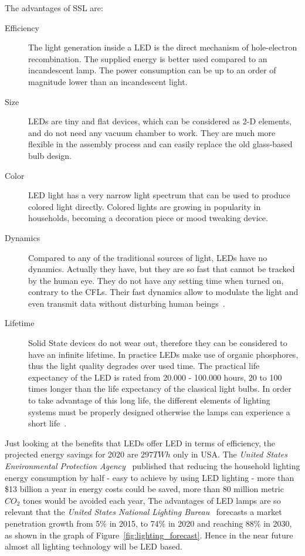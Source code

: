 The advantages of SSL are:
\begin{description}
  \item [Efficiency] The light generation inside a LED is the direct mechanism of hole-electron recombination. The supplied energy is better used compared to an incandescent lamp. The power consumption can be up to an order of magnitude lower than an incandescent light.

  \item [Size] LEDs are tiny and flat devices, which can be considered as 2-D elements,  and do not need any vacuum chamber to work. They are much more flexible in the assembly process and can easily replace the old glass-based bulb design.

  \item [Color] LED light has a very narrow light spectrum that can be used to produce colored light directly. Colored lights are growing in popularity in households, becoming a decoration piece or mood tweaking device.

  \item [Dynamics] Compared to any of the traditional sources of light, LEDs have no dynamics. Actually they have, but they are so fast that cannot be tracked by the human eye. They do not have any setting time when turned on, contrary to the CFLs. Their fast dynamics allow to modulate the light and even transmit data without disturbing human beings~\cite{2000Tanaka,2004Komine}.

  \item [Lifetime] Solid State devices do not wear out, therefore they can be considered to have an infinite lifetime. In practice LEDs make use of organic phosphores, thus the light quality degrades over used time. The practical life expectancy of the LED is rated from 20.000 - 100.000 hours, 20 to 100 times longer than the life expectancy of the classical light bulbs. In order to take advantage of this long life, the different elements of lighting systems must be properly designed otherwise the lamps can experience a short life~\cite{2005Narendran}.
\end{description}

Just looking at the benefits that LEDs offer LED in terms of efficiency, the projected energy savings for 2020 are $297TWh$ only in USA. The \emph{United States Environmental Protection Agency}~\cite{14USDoE} published that reducing the household lighting energy consumption by half - easy to achieve by using LED lighting -  more than \$13 billion a year in energy costs could be saved, more than 80 million metric $CO_2$ tones would be avoided each year, %
The advantages of LED lamps are so relevant that the \emph{United States National Lighting Bureau}~\cite{14USDoE} forecasts a market penetration growth from 5\% in 2015, to 74\% in 2020 and reaching 88\% in 2030, as shown in the graph of Figure~\ref{fig:lighting_forecast}. Hence in the near future almost all lighting technology will be LED based.

